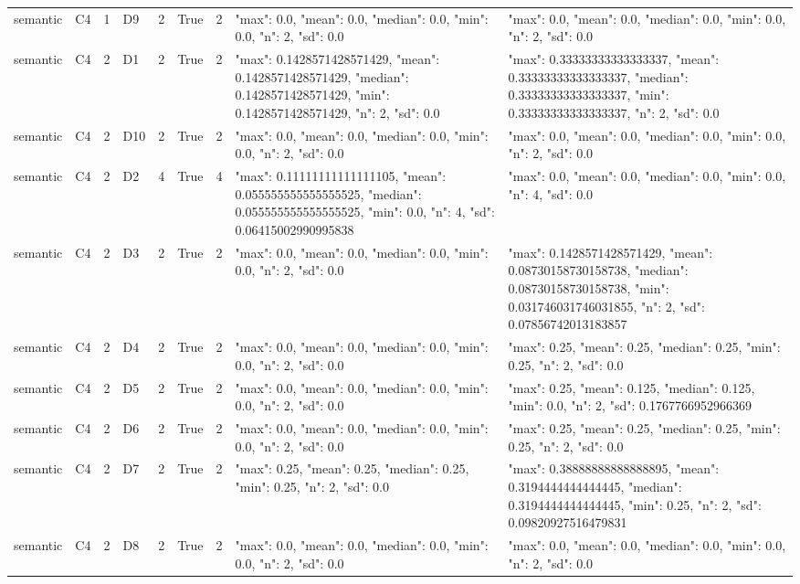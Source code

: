 \begin{tabular}{lllllllll}
semantic & C4 & 1 & D9 & 2 & True & 2 & {"max": 0.0, "mean": 0.0, "median": 0.0, "min": 0.0, "n": 2, "sd": 0.0} & {"max": 0.0, "mean": 0.0, "median": 0.0, "min": 0.0, "n": 2, "sd": 0.0} \\
semantic & C4 & 2 & D1 & 2 & True & 2 & {"max": 0.1428571428571429, "mean": 0.1428571428571429, "median": 0.1428571428571429, "min": 0.1428571428571429, "n": 2, "sd": 0.0} & {"max": 0.33333333333333337, "mean": 0.33333333333333337, "median": 0.33333333333333337, "min": 0.33333333333333337, "n": 2, "sd": 0.0} \\
semantic & C4 & 2 & D10 & 2 & True & 2 & {"max": 0.0, "mean": 0.0, "median": 0.0, "min": 0.0, "n": 2, "sd": 0.0} & {"max": 0.0, "mean": 0.0, "median": 0.0, "min": 0.0, "n": 2, "sd": 0.0} \\
semantic & C4 & 2 & D2 & 4 & True & 4 & {"max": 0.11111111111111105, "mean": 0.055555555555555525, "median": 0.055555555555555525, "min": 0.0, "n": 4, "sd": 0.06415002990995838} & {"max": 0.0, "mean": 0.0, "median": 0.0, "min": 0.0, "n": 4, "sd": 0.0} \\
semantic & C4 & 2 & D3 & 2 & True & 2 & {"max": 0.0, "mean": 0.0, "median": 0.0, "min": 0.0, "n": 2, "sd": 0.0} & {"max": 0.1428571428571429, "mean": 0.08730158730158738, "median": 0.08730158730158738, "min": 0.031746031746031855, "n": 2, "sd": 0.07856742013183857} \\
semantic & C4 & 2 & D4 & 2 & True & 2 & {"max": 0.0, "mean": 0.0, "median": 0.0, "min": 0.0, "n": 2, "sd": 0.0} & {"max": 0.25, "mean": 0.25, "median": 0.25, "min": 0.25, "n": 2, "sd": 0.0} \\
semantic & C4 & 2 & D5 & 2 & True & 2 & {"max": 0.0, "mean": 0.0, "median": 0.0, "min": 0.0, "n": 2, "sd": 0.0} & {"max": 0.25, "mean": 0.125, "median": 0.125, "min": 0.0, "n": 2, "sd": 0.1767766952966369} \\
semantic & C4 & 2 & D6 & 2 & True & 2 & {"max": 0.0, "mean": 0.0, "median": 0.0, "min": 0.0, "n": 2, "sd": 0.0} & {"max": 0.25, "mean": 0.25, "median": 0.25, "min": 0.25, "n": 2, "sd": 0.0} \\
semantic & C4 & 2 & D7 & 2 & True & 2 & {"max": 0.25, "mean": 0.25, "median": 0.25, "min": 0.25, "n": 2, "sd": 0.0} & {"max": 0.38888888888888895, "mean": 0.3194444444444445, "median": 0.3194444444444445, "min": 0.25, "n": 2, "sd": 0.09820927516479831} \\
semantic & C4 & 2 & D8 & 2 & True & 2 & {"max": 0.0, "mean": 0.0, "median": 0.0, "min": 0.0, "n": 2, "sd": 0.0} & {"max": 0.0, "mean": 0.0, "median": 0.0, "min": 0.0, "n": 2, "sd": 0.0} \\

\end{tabular}
